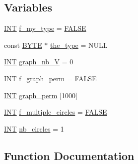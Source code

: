 \subsection*{Variables}
\begin{DoxyCompactItemize}
\item 
\mbox{\hyperlink{galois_8h_a09fddde158a3a20bd2dcadb609de11dc}{I\+NT}} \mbox{\hyperlink{treedraw_8_c_affeed53c6ad12f54f9677ffaedd00e34}{f\+\_\+my\+\_\+type}} = \mbox{\hyperlink{nauty_8h_aa93f0eb578d23995850d61f7d61c55c1}{F\+A\+L\+SE}}
\item 
const \mbox{\hyperlink{galois_8h_ab6cc7b4aeb6ea31aba2b3fbfc83ff5e6}{B\+Y\+TE}} $\ast$ \mbox{\hyperlink{treedraw_8_c_a50c726fea7d1aa6790e8e051d7d2ced3}{the\+\_\+type}} = N\+U\+LL
\item 
\mbox{\hyperlink{galois_8h_a09fddde158a3a20bd2dcadb609de11dc}{I\+NT}} \mbox{\hyperlink{treedraw_8_c_a7c1f8d4bb0cfeeed933657142369c487}{graph\+\_\+nb\+\_\+V}} = 0
\item 
\mbox{\hyperlink{galois_8h_a09fddde158a3a20bd2dcadb609de11dc}{I\+NT}} \mbox{\hyperlink{treedraw_8_c_a11520bfff076f76482f7f88c0952cf44}{f\+\_\+graph\+\_\+perm}} = \mbox{\hyperlink{nauty_8h_aa93f0eb578d23995850d61f7d61c55c1}{F\+A\+L\+SE}}
\item 
\mbox{\hyperlink{galois_8h_a09fddde158a3a20bd2dcadb609de11dc}{I\+NT}} \mbox{\hyperlink{treedraw_8_c_ae7305827ee072abae0d9f4af220164ed}{graph\+\_\+perm}} \mbox{[}1000\mbox{]}
\item 
\mbox{\hyperlink{galois_8h_a09fddde158a3a20bd2dcadb609de11dc}{I\+NT}} \mbox{\hyperlink{treedraw_8_c_adc52b5ce5deda7ac1ff764965e0b8a19}{f\+\_\+multiple\+\_\+circles}} = \mbox{\hyperlink{nauty_8h_aa93f0eb578d23995850d61f7d61c55c1}{F\+A\+L\+SE}}
\item 
\mbox{\hyperlink{galois_8h_a09fddde158a3a20bd2dcadb609de11dc}{I\+NT}} \mbox{\hyperlink{treedraw_8_c_ace75cd3f73244b9493fc59b1d888ee12}{nb\+\_\+circles}} = 1
\end{DoxyCompactItemize}


\subsection{Function Documentation}
\mbox{\label{treedraw_8_c_a39cc8da8d250eb22f46a5727b9123396}} 
